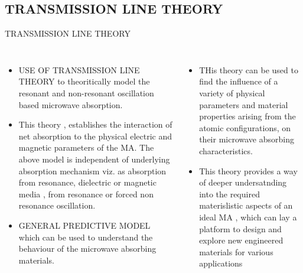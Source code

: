 \documentclass[11pt,aspect ratio=169]{beamer}
\begin{document}
\subsection{TRANSMISSION LINE THEORY}
\begin{frame}{TRANSMISSION LINE THEORY}
	\begin{columns}[]
		
		\begin{itemize}
			\item USE OF TRANSMISSION LINE THEORY to theoritically model the resonant and non-resonant oscillation based microwave absorption.
			\item This theory , establishes the interaction of net absorption to the physical electric and magnetic parameters of the MA.
			The above model is independent of underlying absorption mechanism viz. as absorption from resonance, dielectric or magnetic media , from resonance or forced non resonance oscillation.
			\item GENERAL PREDICTIVE MODEL which can be used to understand the behaviour of the microwave absorbing materials.
		\end{itemize}
		\begin{itemize}
			
			\item THis theory can be used to find the influence of a variety of physical parameters and material properties arising from the atomic configurations, on their microwave absorbing characteristics.
			\item This theory provides a way of deeper undersatnding into the required materislistic aspects of an ideal MA , which can lay a platform to design and explore new engineered materials for various applications
		\end{itemize}
		
	\end{columns}
\end{frame}

\end{document}
